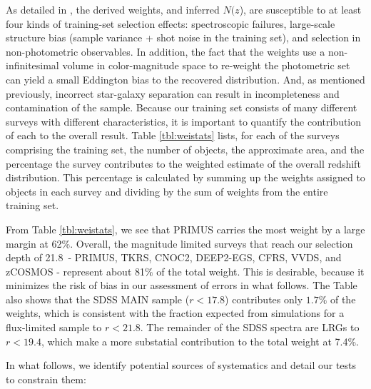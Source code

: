 \documentclass[preprint]{aastex}
\newcommand{\rmax}{21.8}
\newcommand{\Nofz}{$N(z$)}
\begin{document}
As detailed in \cite{CunhaPhotoz09}, the derived weights, and inferred \Nofz,
are susceptible to at least four kinds of training-set selection effects:
spectroscopic failures, large-scale structure bias (sample variance + shot
noise in the training set), and selection in non-photometric observables.  In
addition, the fact that the weights use a non-infinitesimal volume in color-magnitude
space to re-weight the photometric set can yield a small Eddington bias to the
recovered distribution.  And, as mentioned previously, incorrect star-galaxy
separation can result in incompleteness and contamination of the sample.
Because our training set consists of many different surveys with different
characteristics, it is important to quantify the contribution of each to the
overall result.  Table \ref{tbl:weistats} lists, for each of the surveys
comprising the training set, the number of objects, the approximate area, and
the percentage the survey contributes to the weighted estimate of the overall
redshift distribution.  This percentage is calculated by summing up the weights
assigned to objects in each survey and dividing by the sum of weights from the
entire training set.


From Table \ref{tbl:weistats}, we see that PRIMUS carries the most weight by a
large margin at 62\%.  Overall, the magnitude limited surveys that reach our
selection depth of \rmax\ - PRIMUS, TKRS, CNOC2, DEEP2-EGS, CFRS, VVDS, and
zCOSMOS - represent about 81$\%$ of the total weight.  
This is desirable,
because it minimizes the risk of bias in our assessment of errors in what follows.
The Table also shows that the SDSS MAIN sample ($r<17.8$) contributes only $1.7\%$ of the weights, which
is consistent with the fraction expected from simulations for a flux-limited sample 
to $r<21.8$.
The remainder of the SDSS spectra are LRGs to $r<19.4$, which make a more
substatial contribution to the total weight at 7.4\%.

In what follows, we identify potential sources of systematics and detail our
tests to constrain them:
\end{document}
